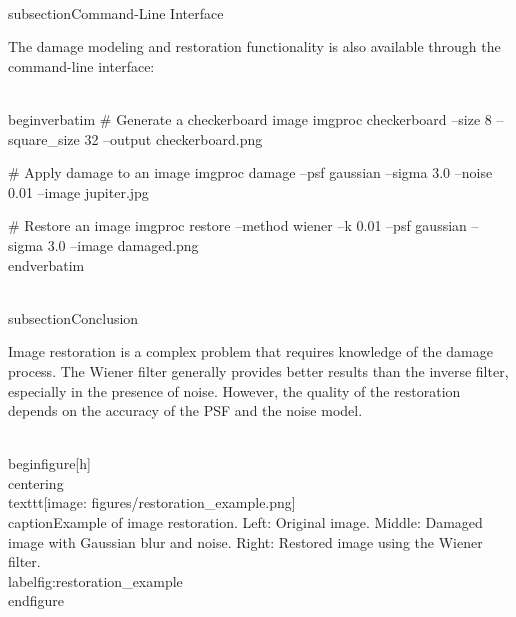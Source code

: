 \\subsection{Command-Line Interface}

The damage modeling and restoration functionality is also available through the command-line interface:

\\begin{verbatim}
# Generate a checkerboard image
imgproc checkerboard --size 8 --square_size 32 --output checkerboard.png

# Apply damage to an image
imgproc damage --psf gaussian --sigma 3.0 --noise 0.01 --image jupiter.jpg

# Restore an image
imgproc restore --method wiener --k 0.01 --psf gaussian --sigma 3.0 --image damaged.png
\\end{verbatim}

\\subsection{Conclusion}

Image restoration is a complex problem that requires knowledge of the damage process. The Wiener filter generally provides better results than the inverse filter, especially in the presence of noise. However, the quality of the restoration depends on the accuracy of the PSF and the noise model.

\\begin{figure}[h]
\\centering
\\texttt{[image: figures/restoration\_example.png]}
\\caption{Example of image restoration. Left: Original image. Middle: Damaged image with Gaussian blur and noise. Right: Restored image using the Wiener filter.}
\\label{fig:restoration_example}
\\end{figure}
